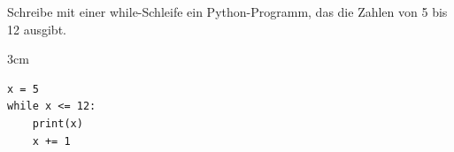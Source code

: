 \question[3]
Schreibe mit einer while-Schleife ein Python-Programm, das die Zahlen von 5 bis 12 ausgibt.

\begin{solutionbox}{3cm}
\begin{lstlisting}
x = 5
while x <= 12:
    print(x)
    x += 1
\end{lstlisting}
\end{solutionbox}